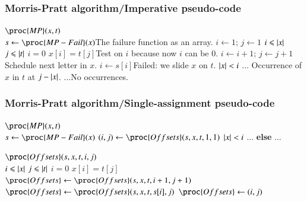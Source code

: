 %
\begin{frame}
\frametitle{Morris-Pratt algorithm/Imperative pseudo-code}

{\small
\begin{codebox}
\(\proc{MP} (x, t)\)\\
\li \(s \gets \proc{MP-Fail} (x)\)\>\>\>\>\>\>\>\>\>\>\Comment The failure function as an array.
\li \(i \gets 1\); \(j \gets 1\)
\li \While \(i \leqslant \lvert{x}\lvert{}\) \LogAnd \(j \leqslant \lvert{t}\lvert{}\)
\li \Do \If \(i = 0\) \LogOr \(x[i] = t[j]\)\>\>\>\>\>\>\>\>\Comment Test on \(i\) because now \(i\) can be 0.
\li	  \Then \(i \gets i + 1\); \(j \gets j + 1\)\>\>\>\>\>\>\Comment Schedule next letter in \(x\).
\li	  \Else \(i \gets s[i]\)\>\>\>\>\>\>\Comment Failed: we slide \(x\) on \(t\).
          \End
    \End
\li \If \(\lvert{x}\lvert{} < i\)
\li \Then \(\ldots\) \>\>\>\>\>\>\>\>\Comment Occurrence of \(x\) in \(t\) at \(j - \lvert{x}\lvert{}\).
\li \Else \(\ldots\)\>\>\>\>\>\>\>\>\Comment No occurrences.
    \End
\end{codebox}
}

\end{frame}

%
\begin{frame}
\frametitle{Morris-Pratt algorithm/Single-assignment pseudo-code}

\begin{codebox}
\(\proc{MP} (x, t)\)\\
\li \(s \gets \proc{MP-Fail} (x)\)
\li \((i, j) \gets \proc{Offsets} (s,x,t,1,1)\)
\li \If \(\lvert{x}\lvert{} < i\)
\li \Then \(\ldots\) \textbf{else} \(\ldots\)
    \End
\end{codebox}
\begin{codebox}
\(\proc{Offsets} (s,x,t,i,j)\)\\
\li \If \(i \leqslant \lvert{x}\lvert{}\) \LogAnd \(j \leqslant \lvert{t}\lvert{}\)
\li \Then \If \(i = 0\) \LogOr \(x[i] = t[j]\)
\li	      \Then \(\proc{Offsets} \gets \proc{Offsets} (s, x, t, i+1, j+1)\)
\li       \Else \(\proc{Offsets} \gets \proc{Offsets} (s, x, t, s[i], j)\)
          \End
\li	\Else \(\proc{Offsets} \gets (i, j)\)
    \End
\end{codebox}

\end{frame}

